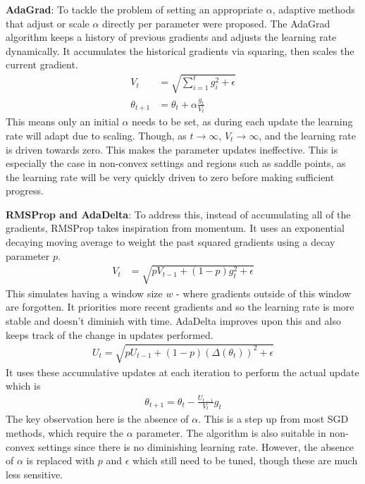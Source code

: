 \textbf{AdaGrad}: To tackle the problem of setting an appropriate $\alpha$, adaptive methods that adjust or scale $\alpha$ directly per parameter were proposed. The AdaGrad algorithm keeps a history of previous gradients and adjusts the learning rate dynamically. It accumulates the historical gradients via squaring, then scales the current gradient.
\begin{align}
    V_t &= \sqrt{\sum_{i=1}^{t} g_i^2 + \epsilon} \\
    \theta_{t+1} &= \theta_{t} + \alpha \frac{g_t}{V_t}
\end{align}
This means only an initial $\alpha$ needs to be set, as during each update the learning rate will adapt due to scaling. Though, as $t \rightarrow \infty$, $V_{t} \rightarrow \infty$, and the learning rate is driven towards zero. This makes the parameter updates ineffective. This is especially the case in non-convex settings and regions such as saddle points, as the learning rate will be very quickly driven to zero before making sufficient progress.

\textbf{RMSProp and AdaDelta}: To address this, instead of accumulating all of the gradients, RMSProp takes inspiration from momentum. It uses an exponential decaying moving average to weight the past squared gradients using a decay parameter $p$.
\begin{align}
    V_t &= \sqrt{p V_{t-1} + (1 - p)g_t^2 + \epsilon} 
\end{align}
This simulates having a window size $w$ - where gradients outside of this window are forgotten. It priorities more recent gradients and so the learning rate is more stable and doesn't diminish with time. AdaDelta improves upon this and also keeps track of the change in updates performed.
\begin{align}
    U_t = \sqrt{p U_{t-1} + (1 - p)(\Delta(\theta_t))^2 + \epsilon}
\end{align}
It uses these accumulative updates at each iteration to perform the actual update which is 
\begin{align}
    \theta_{t+1} = \theta_{t} - \frac{U_{t-1}}{V_{t}} g_t
\end{align}
The key observation here is the absence of $\alpha$. This is a step up from most SGD methods, which require the $\alpha$ parameter. The algorithm is also suitable in non-convex settings since there is no diminishing learning rate. However, the absence of $\alpha$ is replaced with $p$ and $\epsilon$ which still need to be tuned, though these are much less sensitive.

